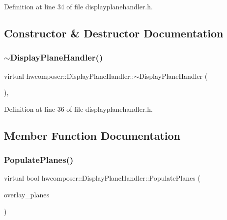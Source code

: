 Definition at line 34 of file displayplanehandler.\+h.



\subsection{Constructor \& Destructor Documentation}
\mbox{\label{classhwcomposer_1_1DisplayPlaneHandler_aeab8a4a0c1db272293b3b6db6c7cd7b6}} 
\subsubsection{\texorpdfstring{$\sim$\+Display\+Plane\+Handler()}{~DisplayPlaneHandler()}}
{\footnotesize\ttfamily virtual hwcomposer\+::\+Display\+Plane\+Handler\+::$\sim$\+Display\+Plane\+Handler (\begin{DoxyParamCaption}{ }\end{DoxyParamCaption})\hspace{0.3cm}{\ttfamily [inline]}, {\ttfamily [virtual]}}



Definition at line 36 of file displayplanehandler.\+h.


\begin{DoxyCode}{0}
\end{DoxyCode}


\subsection{Member Function Documentation}
\mbox{\label{classhwcomposer_1_1DisplayPlaneHandler_aa4d32269c693dbf4a4c91c31ed577784}} 
\subsubsection{\texorpdfstring{Populate\+Planes()}{PopulatePlanes()}}
{\footnotesize\ttfamily virtual bool hwcomposer\+::\+Display\+Plane\+Handler\+::\+Populate\+Planes (\begin{DoxyParamCaption}\item[{std\+::vector$<$ std\+::unique\+\_\+ptr$<$ \mbox{\hyperlink{classhwcomposer_1_1DisplayPlane}{Display\+Plane}} $>$$>$ \&}]{overlay\+\_\+planes }\end{DoxyParamCaption})\hspace{0.3cm}{\ttfamily [pure virtual]}}



